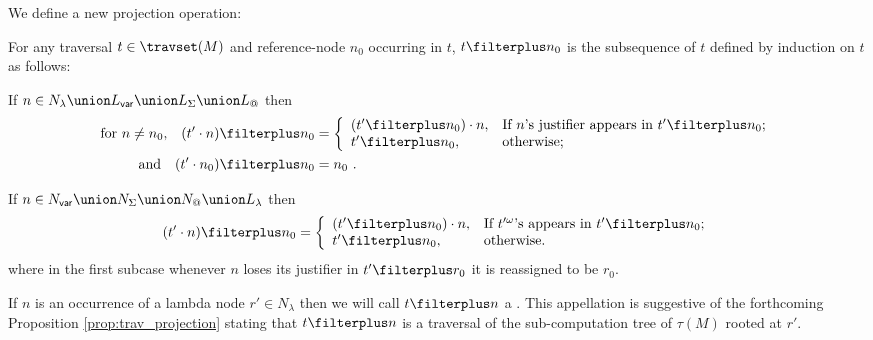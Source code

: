 We define a new projection operation:
\begin{definition}
 For any traversal $t\in \travset(M)$ and reference-node $n_0$ occurring in $t$, $t \filterplus n_0$
is the subsequence of $t$ defined by induction on $t$ as follows:
\begin{compactitem}
\item If $n\in N_\lambda \union L_{\sf var} \union L_\Sigma \union L_@$ then
\begin{align*}
\hbox{for $n\neq n_0$,}\quad (t' \cdot n) \filterplus n_0 &= \left\{
                                  \begin{array}{ll}
                                    (t'\filterplus n_0) \cdot n, & \hbox{If $n$'s justifier appears in $t'\filterplus n_0$;} \\
                                    t'\filterplus n_0, & \hbox{otherwise;}
                                  \end{array}
                                \right. \\
\hbox{and}\quad         (t' \cdot n_0) \filterplus n_0& = n_0 \ .
\end{align*}

\item If $n \in N_{\sf var} \union N_\Sigma \union N_@ \union L_\lambda$ then
$$
(t' \cdot n) \filterplus n_0 = \left\{
                                  \begin{array}{ll}
                                    (t'\filterplus n_0) \cdot n, & \hbox{If $t'^\omega$'s appears in $t'\filterplus n_0$;} \\
                                    t'\filterplus n_0, & \hbox{otherwise.}
                                  \end{array}
                                \right.
$$
where in the first subcase whenever $n$ loses its justifier in
$t'\filterplus r_0$ it is reassigned to be $r_0$.
\end{compactitem}
\end{definition}

If $n$ is an occurrence of a lambda node $r' \in N_\lambda$ then we
will call $t \filterplus n$ a . This appellation is suggestive of the
forthcoming Proposition \ref{prop:trav_projection} stating that $t
\filterplus n$ is a traversal of the sub-computation tree of
$\tau(M)$ rooted at $r'$.
\bigskip


